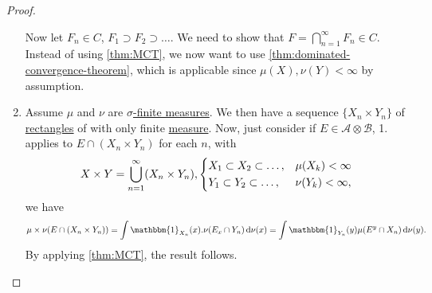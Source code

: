 \begin{proof}
\begin{enumerate}
		      \par Now let \(F_{n} \in C\), \(F_1\supset F_2\supset \dots  \). We need to show that \(F = \bigcap\limits_{n=1}^{\infty} F_{n} \in C\).
		      Instead of using \autoref{thm:MCT}, we now want to use \autoref{thm:dominated-convergence-theorem}, which is applicable since \(\mu (X), \nu (Y)< \infty \)
		      by assumption.
		\item Assume \(\mu\) and \(\nu \) are \hyperref[def:sigma-finite-measure]{\(\sigma \)-finite measures}. We then have a sequence \(\{X_n \times Y_n\}\)
		      of \hyperref[def:rectangle]{rectangles} of with only finite \hyperref[def:measure]{measure}. Now, just consider if \(E\in \mathcal{A} \otimes \mathcal{B} \),
		      1. applies to \(E \cap (X_{n} \times Y_{n} )\) for each \(n\), with
		      \[
			      X\times Y = \bigcup\limits_{n=1}^{\infty} (X_{n} \times Y_{n} ), \begin{dcases}
				      X_1\subset X_2\subset \dots , & \mu (X_{k} )< \infty   \\
				      Y_1\subset Y_2\subset \dots , & \nu (Y_{k} )< \infty ,
			      \end{dcases}
		      \]
		      we have
		      \[
			      \mu \times \nu (E \cap (X_{n} \times Y_{n} )) = \int \mathbbm{1}_{X_{n} } (x) . \nu (E_{x} \cap Y_{n} )\,\mathrm{d} \nu (x) = \int \mathbbm{1}_{Y_{n} } (y)\mu (E^y \cap X_{n} )\,\mathrm{d} \nu (y).
		      \]
		      By applying \autoref{thm:MCT}, the result follows.
	\end{enumerate}
\end{proof}

